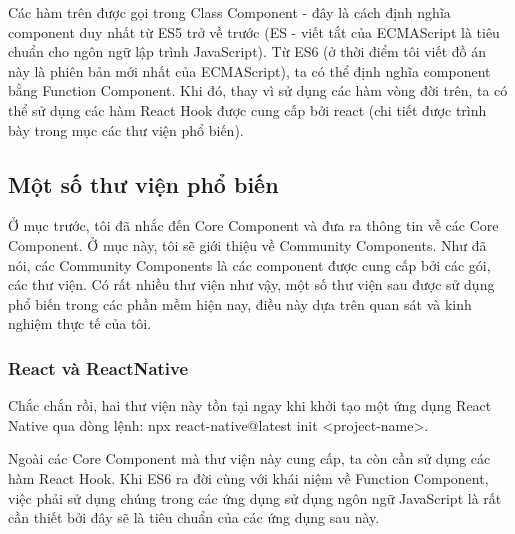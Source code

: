     Các hàm trên được gọi trong Class Component - đây là cách định nghĩa component duy nhất từ ES5 trở về trước (ES - viết tắt của ECMAScript là tiêu chuẩn cho ngôn ngữ lập trình JavaScript). Từ ES6 (ở thời điểm tôi viết đồ án này là phiên bản mới nhất của ECMAScript), ta có thể định nghĩa component bằng Function Component. Khi đó, thay vì sử dụng các hàm vòng đời trên, ta có thể sử dụng các hàm React Hook được cung cấp bởi react (chi tiết được trình bày trong mục các thư viện phổ biến).

\subsection{Một số thư viện phổ biến}
    Ở mục trước, tôi đã nhắc đến Core Component và đưa ra thông tin về các Core Component. Ở mục này, tôi sẽ giới thiệu về Community Components. Như đã nói, các Community Components là các component được cung cấp bởi các gói, các thư viện. Có rất nhiều thư viện như vậy, một số thư viện sau được sử dụng phổ biến trong các phần mềm hiện nay, điều này dựa trên quan sát và kinh nghiệm thực tế của tôi.
    \subsubsection{React và ReactNative}
    Chắc chắn rồi, hai thư viện này tồn tại ngay khi khởi tạo một ứng dụng React Native qua dòng lệnh: npx react-native@latest init <project-name>.

    Ngoài các Core Component mà thư viện này cung cấp, ta còn cần sử dụng các hàm React Hook. Khi ES6 ra đời cùng với khái niệm về Function Component, việc phải sử dụng chúng trong các ứng dụng sử dụng ngôn ngữ JavaScript là rất cần thiết bởi đây sẽ là tiêu chuẩn của các ứng dụng sau này.

